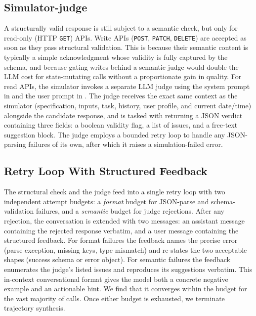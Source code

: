 \subsection{Simulator-judge}
A structurally valid response is still subject to a semantic check, but only for read-only (HTTP \texttt{GET}) APIs. Write APIs (\texttt{POST}, \texttt{PATCH}, \texttt{DELETE}) are accepted as soon as they pass structural validation. This is because their semantic content is typically a simple acknowledgment whose validity is fully captured by the schema, and because gating writes behind a semantic judge would double the LLM cost for state-mutating calls without a proportionate gain in quality. For read APIs, the simulator invokes a separate LLM judge using the system prompt in  and the user prompt in . The judge receives the exact same context as the simulator (specification, inputs, task, history, user profile, and current date/time) alongside the candidate response, and is tasked with returning a JSON verdict containing three fields: a boolean validity flag, a list of issues, and a free-text suggestion block. The judge employs a bounded retry loop to handle any JSON-parsing failures of its own, after which it raises a simulation-failed error.

\subsection{Retry Loop With Structured Feedback}
\label{app:sim_retry}
The structural check and the judge feed into a single retry loop with two independent attempt budgets: a \emph{format} budget for JSON-parse and schema-validation failures, and a \emph{semantic} budget for judge rejections. After any rejection, the conversation is
extended with two messages: an assistant message containing the rejected response verbatim, and a user message containing the structured feedback. For format failures the feedback names the precise error (parse exception, missing keys, type mismatch) and re-states the
two acceptable shapes (success schema or error object). For semantic failures the feedback enumerates the judge's listed issues and reproduces its suggestions verbatim. This in-context conversational format gives the model both a concrete negative example and an actionable hint. We find that it converges within the budget for the vast majority of calls. Once either budget is exhausted, we terminate trajectory synthesis.




